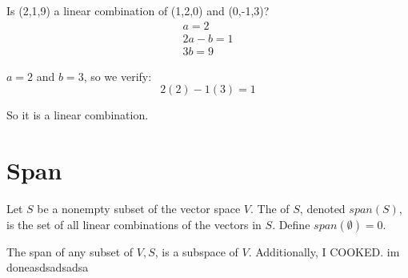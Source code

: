 \documentclass{article}
\begin{document}
\begin{example}[Vectors]
\end{example}

Is (2,1,9) a linear combination of (1,2,0) and (0,-1,3)?
\begin{align*}
    a = 2\\
    2a - b = 1\\
    3b = 9
\end{align*}

$a = 2$ and $b = 3$, so we verify:
\[
2(2) - 1(3) = 1
\]

So it is a linear combination.

\section{Span}
\begin{definition}
    Let $S$ be a nonempty subset of the vector space $V$. The  of $S$, denoted $span(S)$, is the set of all linear combinations of the vectors in $S$. Define $span(\emptyset) = 0$.
\end{definition}

\begin{theorem}
    The span of any subset of $V, S$, is a subspace of $V$. Additionally, I COOKED. im doneasdsadsadsa
\end{theorem}
\end{document}
